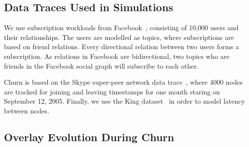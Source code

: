 \subsection{Data Traces Used in Simulations}

We use subscription workloads from Facebook~\cite{facebook-eurosys09},
consisting of 10,000 users and their relationships.  The users are
modelled as topics, where subscriptions are based on friend relations.
Every directional relation between two users forms a subscription. As
relations in Facebook are bidirectional, two topics who are friends in
the Facebook social graph will subscribe to each other.

Churn is based on the Skype super-peer network data
trace~\cite{Guha:2006}, where 4000 nodes are tracked for joining and
leaving timestamps for one month staring on September 12, 2005. Finally,
we use the King dataset~\cite{king} in order to model latency between
nodes.

\subsection{Overlay Evolution During Churn}
\label{sec:churn}

